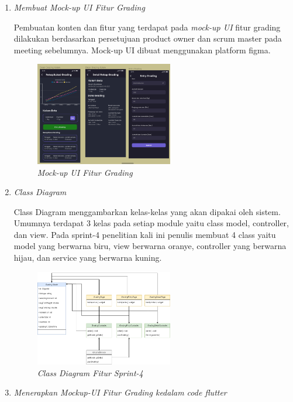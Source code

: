 \begin{enumerate}[listparindent=2em]
	
	\item{\textit{Membuat Mock-up UI Fitur Grading}}
	
	Pembuatan konten dan fitur yang terdapat pada \textit{mock-up UI} fitur grading dilakukan berdasarkan persetujuan product owner dan scrum master pada meeting sebelumnya. Mock-up UI dibuat menggunakan platform figma.
	
	\begin{figure}[H]
	\centering
	\includegraphics[keepaspectratio, width=6cm]{gambar/mockupgrading}
	\caption{\textit{Mock-up UI Fitur Grading}}
	\label{gambar:mockupgrading}
	\end{figure}

	\item{\textit{Class Diagram}}
	
	Class Diagram menggambarkan kelas-kelas yang akan dipakai oleh sistem. Umumnya terdapat 3 kelas pada setiap module yaitu class model, controller, dan view. Pada sprint-4 penelitian kali ini penulis membuat 4 class yaitu model yang berwarna biru, view berwarna oranye, controller yang berwarna hijau, dan service yang berwarna kuning.
	 
	 \begin{figure}[H]
	 \centering
	 \includegraphics[keepaspectratio, width=6cm]{gambar/gradingcd}
	 \caption{\textit{Class Diagram Fitur Sprint-4}}
	 \label{gambar:gradingcd}
	 \end{figure}


	\item{\textit{Menerapkan Mockup-UI Fitur Grading kedalam code flutter}}
	

\end{enumerate}
